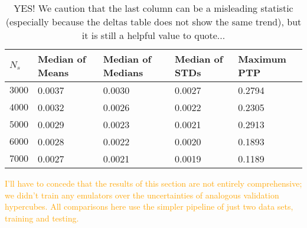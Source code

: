 \begin{table}[ht!]
\centering
\begin{tabular}{l|l|l|l|l}
\hline
$N_s$ & Median of Means & Median of Medians & Median of STDs & Maximum PTP \\ \hline
$3000$ & 0.0037 & 0.0030 & 0.0027 & 0.2794 \\
$4000$ & 0.0032 & 0.0026 & 0.0022 & 0.2305 \\
$5000$ & 0.0029 & 0.0023 & 0.0021 & 0.2913 \\
$6000$ & 0.0028 & 0.0022 & 0.0020 & 0.1893 \\
$7000$ & 0.0027 & 0.0021 & 0.0019 & 0.1189 \\
\end{tabular}
	\cprotect\caption[$N_s$ Experiment: Percent Error Statistics]{YES!
		We caution that the last column can be a misleading statistic
		(especially because the deltas table does not show the same trend), but
		it is still a helpful value to quote...}
 \label{tab: Ns_experiment_percerr_stats}
\end{table}



\textcolor{orange}{I'll have to concede that the results of this section are 
not entirely comprehensive; we didn't train any emulators over the 
uncertainties of analogous validation hypercubes. All comparisons here use the
simpler pipeline of just two data sets, training and testing.}
